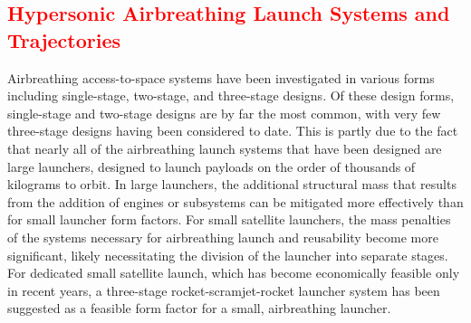   
  
  
  

   
   
   






    \textcolor{red}{
  \section{Hypersonic Airbreathing Launch Systems and Trajectories}\label{sec:AscentTrajectories}
}
  
    
Airbreathing access-to-space systems have been investigated in various forms including single-stage, two-stage, and three-stage designs. 
Of these design forms, single-stage and two-stage designs are by far the most common, with very few three-stage designs having been considered to date. This is partly due to the fact that nearly all of the airbreathing launch systems that have been designed are large launchers, designed to launch payloads on the order of thousands of kilograms to orbit. In large launchers, the additional structural mass that results from the addition of engines or subsystems can be mitigated more effectively than for small launcher form factors.
For small satellite launchers, the mass penalties of the systems necessary for airbreathing launch and reusability become more significant, likely necessitating the division of the launcher into separate stages. 
For dedicated small satellite launch, which has become economically feasible only in recent years, a three-stage rocket-scramjet-rocket launcher system has been suggested as a feasible form factor for a small, airbreathing launcher\cite{Preller2017b}. 

